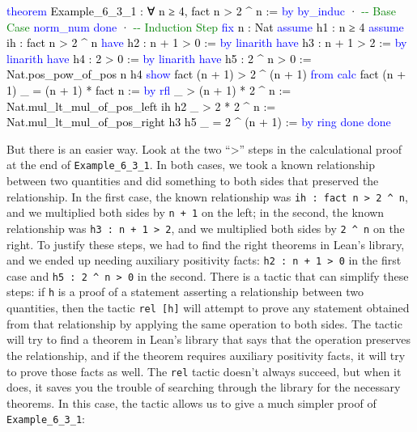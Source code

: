 \documentclass[
  letterpaper,
  DIV=11,
  numbers=noendperiod]{scrreprt}
\newenvironment{Shaded}{\begin{snugshade}}{\end{snugshade}}
\newcommand{\CommentTok}[1]{\textcolor[rgb]{0.37,0.37,0.37}{#1}}
\newcommand{\KeywordTok}[1]{\textcolor[rgb]{0.00,0.23,0.31}{#1}}
\newcommand{\NormalTok}[1]{\textcolor[rgb]{0.00,0.23,0.31}{#1}}
\renewcommand{\NormalTok}[1]{\textcolor[HTML]{000000}{#1}}
\renewcommand{\KeywordTok}[1]{\textcolor[HTML]{0000FF}{#1}}
\renewcommand{\CommentTok}[1]{\textcolor[HTML]{008000}{#1}}
\theoremstyle{remark}
\begin{document}
\begin{Shaded}
\begin{Highlighting}[]
\KeywordTok{theorem}\NormalTok{ Example\_6\_3\_1 : ∀ n ≥ 4, fact n \textgreater{} 2 \^{} n := }\KeywordTok{by}
  \KeywordTok{by\_induc}
\NormalTok{  · }\CommentTok{{-}{-} Base Case}
    \KeywordTok{norm\_num}
    \KeywordTok{done}
\NormalTok{  · }\CommentTok{{-}{-} Induction Step}
    \KeywordTok{fix}\NormalTok{ n : Nat}
    \KeywordTok{assume}\NormalTok{ h1 : n ≥ 4}
    \KeywordTok{assume}\NormalTok{ ih : fact n \textgreater{} 2 \^{} n}
    \KeywordTok{have}\NormalTok{ h2 : n + 1 \textgreater{} 0 := }\KeywordTok{by} \KeywordTok{linarith}
    \KeywordTok{have}\NormalTok{ h3 : n + 1 \textgreater{} 2 := }\KeywordTok{by} \KeywordTok{linarith}
    \KeywordTok{have}\NormalTok{ h4 : 2 \textgreater{} 0 := }\KeywordTok{by} \KeywordTok{linarith}
    \KeywordTok{have}\NormalTok{ h5 : 2 \^{} n \textgreater{} 0 := Nat.pos\_pow\_of\_pos n h4}
    \KeywordTok{show}\NormalTok{ fact (n + 1) \textgreater{} 2 \^{} (n + 1) }\KeywordTok{from}
      \KeywordTok{calc}\NormalTok{ fact (n + 1)}
\NormalTok{        \_ = (n + 1) * fact n := }\KeywordTok{by} \KeywordTok{rfl}
\NormalTok{        \_ \textgreater{} (n + 1) * 2 \^{} n := Nat.mul\_lt\_mul\_of\_pos\_left ih h2}
\NormalTok{        \_ \textgreater{} 2 * 2 \^{} n := Nat.mul\_lt\_mul\_of\_pos\_right h3 h5}
\NormalTok{        \_ = 2 \^{} (n + 1) := }\KeywordTok{by} \KeywordTok{ring}
    \KeywordTok{done}
  \KeywordTok{done}
\end{Highlighting}
\end{Shaded}

But there is an easier way. Look at the two ``\textgreater{}'' steps in
the calculational proof at the end of \texttt{Example\_6\_3\_1}. In both
cases, we took a known relationship between two quantities and did
something to both sides that preserved the relationship. In the first
case, the known relationship was
\texttt{ih\ :\ fact\ n\ \textgreater{}\ 2\ \^{}\ n}, and we multiplied
both sides by \texttt{n\ +\ 1} on the left; in the second, the known
relationship was \texttt{h3\ :\ n\ +\ 1\ \textgreater{}\ 2}, and we
multiplied both sides by \texttt{2\ \^{}\ n} on the right. To justify
these steps, we had to find the right theorems in Lean's library, and we
ended up needing auxiliary positivity facts:
\texttt{h2\ :\ n\ +\ 1\ \textgreater{}\ 0} in the first case and
\texttt{h5\ :\ 2\ \^{}\ n\ \textgreater{}\ 0} in the second. There is a
tactic that can simplify these steps: if \texttt{h} is a proof of a
statement asserting a relationship between two quantities, then the
tactic \texttt{rel\ {[}h{]}} will attempt to prove any statement
obtained from that relationship by applying the same operation to both
sides. The tactic will try to find a theorem in Lean's library that says
that the operation preserves the relationship, and if the theorem
requires auxiliary positivity facts, it will try to prove those facts as
well. The \texttt{rel} tactic doesn't always succeed, but when it does,
it saves you the trouble of searching through the library for the
necessary theorems. In this case, the tactic allows us to give a much
simpler proof of \texttt{Example\_6\_3\_1}:
\end{document}
